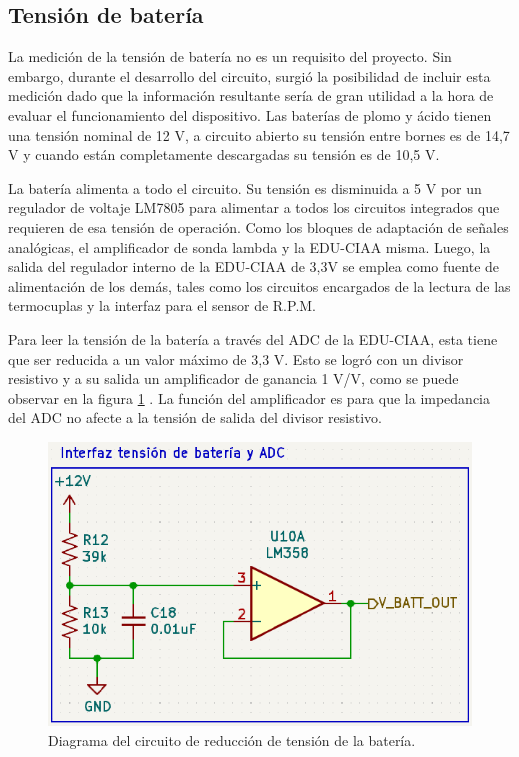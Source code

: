 \subsection{Tensión de batería}

La medición de la tensión de batería no es un requisito del proyecto. Sin embargo, durante el desarrollo del circuito, surgió la posibilidad de incluir esta medición dado que la información resultante sería de gran utilidad a la hora de evaluar el funcionamiento del dispositivo.
Las baterías de plomo y ácido tienen una tensión nominal de 12 V, a circuito abierto su tensión entre bornes es de 14,7 V y cuando están completamente descargadas su tensión es de 10,5 V.

La batería alimenta a todo el circuito. Su tensión es disminuida a 5 V por un regulador de voltaje LM7805 para alimentar a todos los circuitos integrados que requieren de esa tensión de operación. Como los bloques de adaptación de señales analógicas, el amplificador de sonda lambda y la EDU-CIAA misma. Luego, la salida del regulador interno de la EDU-CIAA de 3,3V se emplea como fuente de alimentación de los demás, tales como los circuitos encargados de la lectura de las termocuplas y la interfaz para el sensor de R.P.M.

Para leer la tensión de la batería a través del ADC de la EDU-CIAA, esta tiene que ser reducida a un valor máximo de 3,3 V. Esto se logró con un divisor resistivo y a su salida un amplificador de ganancia 1 V/V, como se puede observar en la figura \ref{fig:circuito-bat} . La función del amplificador es para que la impedancia del ADC no afecte a la tensión de salida del divisor resistivo.

\begin{figure}[htpb]
\centering
\includegraphics[width=.7\textwidth]{./Figures/ampli-bat.png}
\caption{Diagrama del circuito de reducción de tensión de la batería.}
\label{fig:circuito-bat}
\end{figure}

